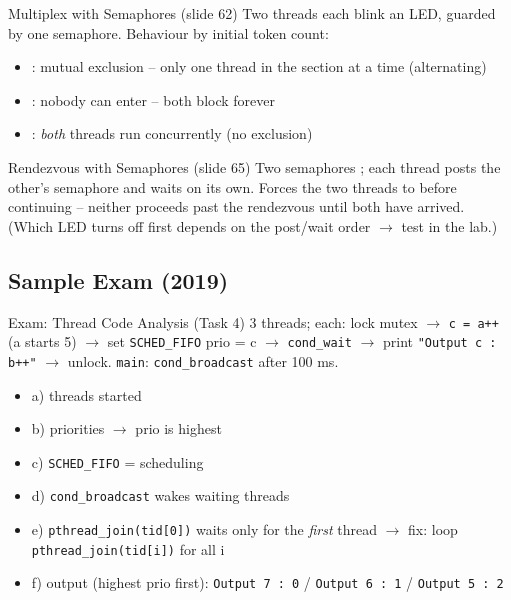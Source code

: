 
\begin{example2}{Multiplex with Semaphores (slide 62)}
    Two threads each blink an LED, guarded by one semaphore. Behaviour by initial
    token count:
    \tcblower
    \begin{itemize}
        \item {}: mutual exclusion -- only one thread in the section
              at a time (alternating)
        \item {}: nobody can enter -- both block forever
        \item {}: \emph{both} threads run concurrently (no exclusion)
    \end{itemize}
\end{example2}

\begin{example2}{Rendezvous with Semaphores (slide 65)}
    Two semaphores ; each thread posts the
    other's semaphore and waits on its own.
    \tcblower
    Forces the two threads to  before continuing --
    neither proceeds past the rendezvous until both have arrived. (Which LED turns
    off first depends on the post/wait order $\to$ test in the lab.)
\end{example2}

\multend

\subsection{Sample Exam (2019)}

\begin{example2}{Exam: Thread Code Analysis (Task 4)}
    3 threads; each: lock mutex $\to$ \texttt{c = a++} (a starts 5) $\to$ set
    \texttt{SCHED\_FIFO} prio = c $\to$ \texttt{cond\_wait} $\to$ print
    \texttt{"Output c : b++"} $\to$ unlock. \texttt{main}: \texttt{cond\_broadcast}
    after 100 ms.
    \tcblower
    \begin{itemize}
        \item a)  threads started
        \item b) priorities  $\to$ prio  is highest
        \item c) \texttt{SCHED\_FIFO} =  scheduling
        \item d) \texttt{cond\_broadcast} wakes  waiting threads
        \item e) \texttt{pthread\_join(tid[0])} waits only for the \emph{first} thread
              $\to$ fix: loop \texttt{pthread\_join(tid[i])} for all i
        \item f) output (highest prio first): \texttt{Output 7 : 0} /
              \texttt{Output 6 : 1} / \texttt{Output 5 : 2}
    \end{itemize}
\end{example2}

